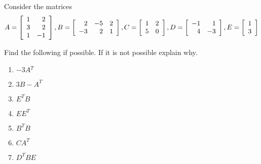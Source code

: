 \documentclass{ximera}
\begin{document}
\begin{problem}\label{prb:4.27} Consider the matrices 
$$
A =\left[
\begin{array}{rr}
1 & 2 \\
3 & 2 \\
1 & -1
\end{array}
\right], B=\left[
\begin{array}{rrr}
2 & -5 & 2 \\
-3 & 2 & 1
\end{array}
\right],
C =\left[
\begin{array}{rr}
1 & 2 \\
5 & 0
\end{array}
\right], \\ D=\left[
\begin{array}{rr}
-1 & 1 \\
4 & -3
\end{array}
\right], E=\left[
\begin{array}{r}
1 \\
3
\end{array}
\right]$$

Find the following if possible. If it is not possible explain why.
\begin{enumerate}
\item $-3A{^T}$
\item $3B - A^{T}$
\item $E^{T}B$
\item $EE^{T}$
\item $B^{T}B$
\item $CA^{T}$
\item $D^{T}BE$
\end{enumerate}


\end{problem}
\end{document}
